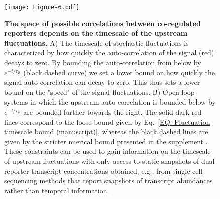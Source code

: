 \documentclass[%
 reprint,prx,
superscriptaddress,
%
%
%
%
%
%
%
%
%
 amsmath,amssymb,
 aps,
%
%
%
%
%
%
]{revtex4-2}
\begin{document}
\begin{figure}[htb!]
\centering
  \texttt{[image: Figure-6.pdf]}
   \caption{
    \textbf{The space of possible correlations between co-regulated reporters depends on the timescale of the upstream fluctuations.} A) The timescale of stochastic fluctuations is characterized by how quickly the auto-correlation of the signal (red) decays to zero. By bounding the auto-correlation from below by $e^{-t/\tau_{R}}$ (black dashed curve) we set a lower bound on how quickly the signal auto-correlation can decay to zero. This thus sets a lower bound on the "speed" of the signal fluctuations. B) Open-loop systems in which the upstream auto-correlation is bounded below by $e^{-t/\tau_{R}}$ are bounded further towards the right. The solid dark red lines correspond to the loose bound given by Eq.~\eqref{EQ: Fluctuation timescale bound (manuscript)}, whereas the black dashed lines are given by the stricter nuerical bound presented in the supplement \cite{SI}.  These constraints can be used to gain information on the timescale of upstream fluctuations with only access to static snapshots of dual reporter transcript concentrations obtained, e.g., from single-cell sequencing methods that report snapshots of transcript abundances rather than temporal information.}
    \label{FIG: Timescales}
\end{figure}
\end{document}
